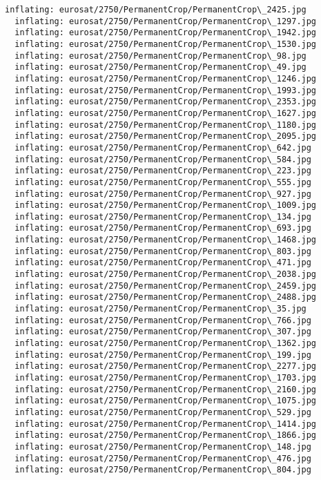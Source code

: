 \documentclass[11pt]{article}
\begin{document}
\begin{Verbatim}[commandchars=\\\{\}]
  inflating: eurosat/2750/PermanentCrop/PermanentCrop\_2425.jpg
  inflating: eurosat/2750/PermanentCrop/PermanentCrop\_1297.jpg
  inflating: eurosat/2750/PermanentCrop/PermanentCrop\_1942.jpg
  inflating: eurosat/2750/PermanentCrop/PermanentCrop\_1530.jpg
  inflating: eurosat/2750/PermanentCrop/PermanentCrop\_98.jpg
  inflating: eurosat/2750/PermanentCrop/PermanentCrop\_49.jpg
  inflating: eurosat/2750/PermanentCrop/PermanentCrop\_1246.jpg
  inflating: eurosat/2750/PermanentCrop/PermanentCrop\_1993.jpg
  inflating: eurosat/2750/PermanentCrop/PermanentCrop\_2353.jpg
  inflating: eurosat/2750/PermanentCrop/PermanentCrop\_1627.jpg
  inflating: eurosat/2750/PermanentCrop/PermanentCrop\_1180.jpg
  inflating: eurosat/2750/PermanentCrop/PermanentCrop\_2095.jpg
  inflating: eurosat/2750/PermanentCrop/PermanentCrop\_642.jpg
  inflating: eurosat/2750/PermanentCrop/PermanentCrop\_584.jpg
  inflating: eurosat/2750/PermanentCrop/PermanentCrop\_223.jpg
  inflating: eurosat/2750/PermanentCrop/PermanentCrop\_555.jpg
  inflating: eurosat/2750/PermanentCrop/PermanentCrop\_927.jpg
  inflating: eurosat/2750/PermanentCrop/PermanentCrop\_1009.jpg
  inflating: eurosat/2750/PermanentCrop/PermanentCrop\_134.jpg
  inflating: eurosat/2750/PermanentCrop/PermanentCrop\_693.jpg
  inflating: eurosat/2750/PermanentCrop/PermanentCrop\_1468.jpg
  inflating: eurosat/2750/PermanentCrop/PermanentCrop\_803.jpg
  inflating: eurosat/2750/PermanentCrop/PermanentCrop\_471.jpg
  inflating: eurosat/2750/PermanentCrop/PermanentCrop\_2038.jpg
  inflating: eurosat/2750/PermanentCrop/PermanentCrop\_2459.jpg
  inflating: eurosat/2750/PermanentCrop/PermanentCrop\_2488.jpg
  inflating: eurosat/2750/PermanentCrop/PermanentCrop\_35.jpg
  inflating: eurosat/2750/PermanentCrop/PermanentCrop\_766.jpg
  inflating: eurosat/2750/PermanentCrop/PermanentCrop\_307.jpg
  inflating: eurosat/2750/PermanentCrop/PermanentCrop\_1362.jpg
  inflating: eurosat/2750/PermanentCrop/PermanentCrop\_199.jpg
  inflating: eurosat/2750/PermanentCrop/PermanentCrop\_2277.jpg
  inflating: eurosat/2750/PermanentCrop/PermanentCrop\_1703.jpg
  inflating: eurosat/2750/PermanentCrop/PermanentCrop\_2160.jpg
  inflating: eurosat/2750/PermanentCrop/PermanentCrop\_1075.jpg
  inflating: eurosat/2750/PermanentCrop/PermanentCrop\_529.jpg
  inflating: eurosat/2750/PermanentCrop/PermanentCrop\_1414.jpg
  inflating: eurosat/2750/PermanentCrop/PermanentCrop\_1866.jpg
  inflating: eurosat/2750/PermanentCrop/PermanentCrop\_148.jpg
  inflating: eurosat/2750/PermanentCrop/PermanentCrop\_476.jpg
  inflating: eurosat/2750/PermanentCrop/PermanentCrop\_804.jpg

\end{Verbatim}
\end{document}
